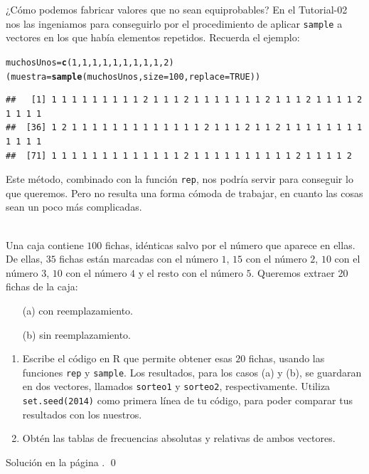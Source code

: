 \documentclass[10pt,a4paper]{article}\usepackage[]{graphicx}\usepackage[]{color}
\makeatletter
\newcommand{\hlnum}[1]{\textcolor[rgb]{0.686,0.059,0.569}{#1}}%
\newcommand{\hlstd}[1]{\textcolor[rgb]{0.345,0.345,0.345}{#1}}%
\newcommand{\hlkwb}[1]{\textcolor[rgb]{0.69,0.353,0.396}{#1}}%
\newcommand{\hlkwc}[1]{\textcolor[rgb]{0.333,0.667,0.333}{#1}}%
\newcommand{\hlkwd}[1]{\textcolor[rgb]{0.737,0.353,0.396}{\textbf{#1}}}%
\newenvironment{kframe}{%
 \def\at@end@of@kframe{}%
 \ifinner\ifhmode%
  \def\at@end@of@kframe{\end{minipage}}%
  \begin{minipage}{\columnwidth}%
 \fi\fi%
 \def\FrameCommand##1{\hskip\@totalleftmargin \hskip-\fboxsep
 \colorbox{shadecolor}{##1}\hskip-\fboxsep
     \hskip-\linewidth \hskip-\@totalleftmargin \hskip\columnwidth}%
 \MakeFramed {\advance\hsize-\width
   \@totalleftmargin\z@ \linewidth\hsize
   \@setminipage}}%
 {\par\unskip\endMakeFramed%
 \at@end@of@kframe}
\newenvironment{knitrout}{}{} %
\newcounter {cont01}
\makeatother
\begin{document}
¿Cómo podemos fabricar valores que no sean equiprobables? En el Tutorial-02 nos las ingeniamos para conseguirlo por el procedimiento de aplicar {\tt sample} a vectores en los que había elementos repetidos. Recuerda el ejemplo:
\begin{knitrout}
\color{fgcolor}\begin{kframe}
\begin{alltt}
\hlstd{muchosUnos} \hlkwb{=} \hlkwd{c}\hlstd{(}\hlnum{1}\hlstd{,}\hlnum{1}\hlstd{,}\hlnum{1}\hlstd{,}\hlnum{1}\hlstd{,}\hlnum{1}\hlstd{,}\hlnum{1}\hlstd{,}\hlnum{1}\hlstd{,}\hlnum{1}\hlstd{,}\hlnum{1}\hlstd{,}\hlnum{2}\hlstd{)}
\hlstd{(muestra} \hlkwb{=} \hlkwd{sample}\hlstd{(muchosUnos,} \hlkwc{size}\hlstd{=}\hlnum{100}\hlstd{,} \hlkwc{replace}\hlstd{=}\hlnum{TRUE}\hlstd{) )}
\end{alltt}
\begin{verbatim}
##   [1] 1 1 1 1 1 1 1 1 1 2 1 1 1 2 1 1 1 1 1 1 1 2 1 1 1 2 1 1 1 1 2 1 1 1 1
##  [36] 1 2 1 1 1 1 1 1 1 1 1 1 1 1 1 2 1 1 1 2 1 1 2 1 1 1 1 1 1 1 1 1 1 1 1
##  [71] 1 1 1 1 1 1 1 1 1 1 1 1 1 2 1 1 1 1 1 1 1 1 1 1 2 1 1 1 1 2
\end{verbatim}
\end{kframe}
\end{knitrout}

Este método, combinado con la función {\tt rep}, nos podría servir para conseguir lo que queremos. Pero no resulta una forma cómoda de trabajar, en cuanto las cosas sean un poco más complicadas.

\begin{ejercicio}
\label{tut03:ejercicio01}
\quad\\
Una caja contiene $100$ fichas, idénticas salvo por el número que aparece en ellas. De ellas, $35$ fichas están marcadas con el número $1$, $15$ con el número $2$, $10$ con el número $3$, $10$ con el número $4$ y el resto con el número $5$. Queremos extraer 20 fichas de la caja:
\begin{itemize}
  \item[(a)] con reemplazamiento.
  \item[(b)] sin reemplazamiento.
\end{itemize}
\begin{enumerate}
  \item Escribe el código en R que permite obtener esas $20$ fichas, usando las funciones {\tt rep} y {\tt sample}. Los resultados, para los casos (a) y (b), se guardaran en dos vectores, llamados {\tt sorteo1} y  {\tt sorteo2}, respectivamente. Utiliza {\tt set.seed(2014)} como primera línea de tu código, para poder comparar tus resultados con los nuestros.
  \item Obtén las tablas de frecuencias absolutas y relativas de ambos vectores.
\end{enumerate}
Solución en la página \pageref{tut03:ejercicio01:sol}.
\qed
\end{ejercicio}
\end{document}
